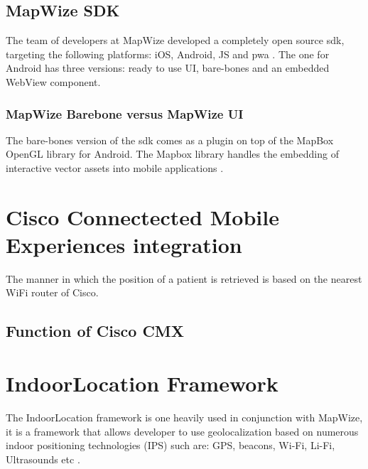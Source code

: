 \subsection{MapWize SDK}
The team of developers at MapWize developed a completely open source \acrshort{sdk}, targeting the following platforms: iOS, Android, JS and \acrfull{pwa} \cite{MapWize.io2019a}. The one for Android has three versions: ready to use UI, bare-bones and an embedded WebView component.
\subsubsection{MapWize Barebone versus MapWize UI}
The bare-bones version of the \acrshort{sdk} comes as a plugin on top of the MapBox OpenGL library for Android. The Mapbox library handles the embedding of interactive vector assets into mobile applications \cite{Mabox2019}.

\section{Cisco Connectected Mobile Experiences integration}
The manner in which the position of a patient is retrieved is based on the nearest WiFi router of Cisco.
\subsection{Function of Cisco CMX}

\section{IndoorLocation Framework}
The IndoorLocation framework is one heavily used in conjunction with MapWize, it is a framework that allows developer to use geolocalization based on numerous indoor positioning technologies (IPS) such are: GPS, beacons, Wi-Fi, Li-Fi, Ultrasounds etc \cite{IndoorLocation.io2019}.



